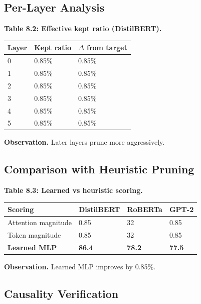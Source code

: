 \subsection{Per-Layer Analysis}

\textbf{Table 8.2: Effective kept ratio (DistilBERT).}

\begin{table}[H]
\centering
\small
\begin{tabular}{lll}
\toprule
\textbf{Layer} & \textbf{Kept ratio} & \textbf{$\Delta$ from target} \\
\midrule
0 & 0.85\% & 0.85\% \\
1 & 0.85\% & 0.85\% \\
2 & 0.85\% & 0.85\% \\
3 & 0.85\% & 0.85\% \\
4 & 0.85\% & 0.85\% \\
5 & 0.85\% & 0.85\% \\
\bottomrule
\end{tabular}
\end{table}

\textbf{Observation.} Later layers prune more aggressively.

\subsection{Comparison with Heuristic Pruning}

\textbf{Table 8.3: Learned vs heuristic scoring.}

\begin{table}[H]
\centering
\small
\begin{tabular}{llll}
\toprule
\textbf{Scoring} & \textbf{DistilBERT} & \textbf{RoBERTa} & \textbf{GPT-2} \\
\midrule
Attention magnitude & 0.85 & 32 & 0.85 \\
Token magnitude & 0.85 & 32 & 0.85 \\
\textbf{Learned MLP} & \textbf{86.4} & \textbf{78.2} & \textbf{77.5} \\
\bottomrule
\end{tabular}
\end{table}

\textbf{Observation.} Learned MLP improves by 0.85\%.

\subsection{Causality Verification}

